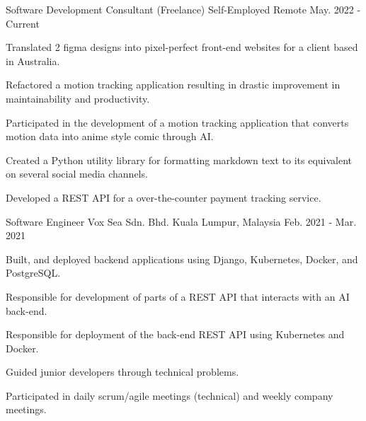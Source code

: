 

\begin{cventries}

\cventry
  {Software Development Consultant (Freelance)} %
  {Self-Employed} %
  {Remote} %
  {May. 2022 - Current} %
  {
    \begin{cvitems} %
      \item {Translated 2 figma designs into pixel-perfect front-end websites for a client based in Australia.}
      \item {Refactored a motion tracking application resulting in drastic improvement in maintainability and productivity.}
      \item {Participated in the development of a motion tracking application that converts motion data into anime style comic through AI.}
      \item {Created a Python utility library for formatting markdown text to its equivalent on several social media channels.}
      \item {Developed a REST API for a over-the-counter payment tracking service.}
    \end{cvitems}
  }

  \cventry
    {Software Engineer} %
    {Vox Sea Sdn. Bhd.} %
    {Kuala Lumpur, Malaysia} %
    {Feb. 2021 - Mar. 2021} %
    {
      \begin{cvitems} %
        \item {Built, and deployed backend applications using Django, Kubernetes, Docker, and PostgreSQL.}
        \item {Responsible for development of parts of a REST API that interacts with an AI back-end.}
        \item {Responsible for deployment of the back-end REST API using Kubernetes and Docker.}
        \item {Guided junior developers through technical problems.}
        \item {Participated in daily scrum/agile meetings (technical) and weekly company meetings.}
      \end{cvitems}
    }


\end{cventries}
